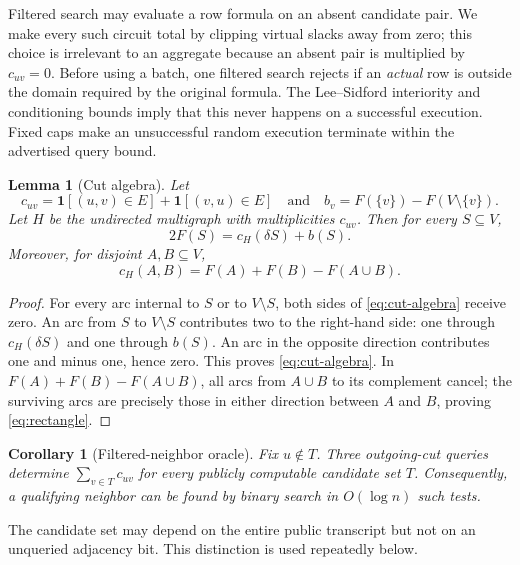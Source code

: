 \documentclass[11pt]{article}
\newtheorem{lemma}[theorem]{Lemma}
\newtheorem{corollary}[theorem]{Corollary}
\theoremstyle{definition}
\newcommand{\id}{\mathbf{1}}
\newcommand{\cH}{c_H}
\begin{document}
Filtered search may evaluate a row formula on an absent candidate pair.  We
make every such circuit total by clipping virtual slacks away from zero; this
choice is irrelevant to an aggregate because an absent pair is multiplied by
$c_{uv}=0$.  Before using a batch, one filtered search rejects if an
\emph{actual} row is outside the domain required by the original formula.
The Lee--Sidford interiority and conditioning bounds imply that this never
happens on a successful execution.  Fixed caps make an unsuccessful random
execution terminate within the advertised query bound.

\begin{lemma}[Cut algebra]\label{lem:cut-algebra}
Let
\[
 c_{uv}=\id[(u,v)\in E]+\id[(v,u)\in E]
 \quad\text{and}\quad
 b_v=F(\{v\})-F(V\setminus\{v\}).
\]
Let $H$ be the undirected multigraph with multiplicities $c_{uv}$.  Then for
every $S\subseteq V$,
\begin{equation}\label{eq:cut-algebra}
        2F(S)=\cH(\delta S)+b(S).
\end{equation}
Moreover, for disjoint $A,B\subseteq V$,
\begin{equation}\label{eq:rectangle}
        \cH(A,B)=F(A)+F(B)-F(A\cup B).
\end{equation}
\end{lemma}

\begin{proof}
For every arc internal to $S$ or to $V\setminus S$, both sides of
\eqref{eq:cut-algebra} receive zero.  An arc from $S$ to $V\setminus S$
contributes two to the right-hand side: one through $\cH(\delta S)$ and one
through $b(S)$.  An arc in the opposite direction contributes one and minus
one, hence zero.  This proves \eqref{eq:cut-algebra}.  In
$F(A)+F(B)-F(A\cup B)$, all arcs from $A\cup B$ to its complement cancel;
the surviving arcs are precisely those in either direction between $A$ and
$B$, proving \eqref{eq:rectangle}.
\end{proof}



\begin{corollary}[Filtered-neighbor oracle]\label{cor:filtered-neighbor}
Fix $u\notin T$.  Three outgoing-cut queries determine
$\sum_{v\in T}c_{uv}$ for every publicly computable candidate set $T$.
Consequently, a qualifying neighbor can be found by binary search in
$O(\log n)$ such tests.
\end{corollary}

The candidate set may depend on the entire public transcript but not on an
unqueried adjacency bit.  This distinction is used repeatedly below.
\end{document}
